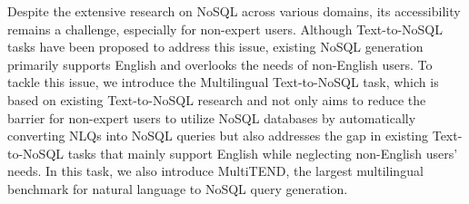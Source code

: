 Despite the extensive research on NoSQL across various domains, its accessibility remains a challenge, especially for non-expert users. Although Text-to-NoSQL tasks have been proposed to address this issue, existing NoSQL generation primarily supports English and overlooks the needs of non-English users.
To tackle this issue, we introduce the Multilingual Text-to-NoSQL task, which is based on existing Text-to-NoSQL research and not only aims to reduce the barrier for non-expert users to utilize NoSQL databases by automatically converting NLQs into NoSQL queries but also addresses the gap in existing Text-to-NoSQL tasks that mainly support English while neglecting non-English users' needs. In this task, we also introduce MultiTEND, the largest multilingual benchmark for natural language to NoSQL query generation.

\newpage